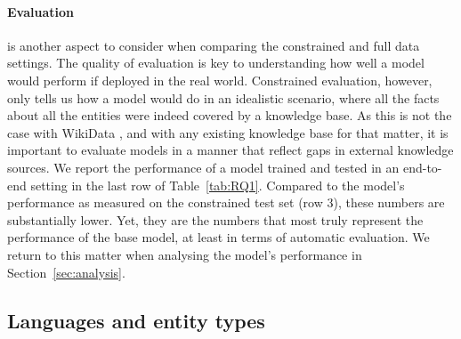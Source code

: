 \documentclass[11pt]{article}
\newcommand{\jttodo}[1]{\todo[color=blue!20]{#1}}
\begin{document}
\paragraph{Evaluation} is another aspect to consider when comparing the constrained and full data settings. The quality of evaluation is key to understanding how well a model would perform if deployed in the real world. Constrained evaluation, however, only tells us how a model would do in an idealistic scenario, where all the facts about all the entities were indeed covered by a knowledge base. As this is not the case with WikiData \cite{balaraman2018recoin}, and with any existing knowledge base for that matter, it is important to evaluate models in a manner that reflect gaps in external knowledge sources. We report the performance of a model trained and tested in an end-to-end setting in the last row of Table~\ref{tab:RQ1}. Compared to the model's performance as measured on the constrained test set (row 3), these numbers are substantially lower. Yet, they are the numbers that most truly represent the performance of the base model, at least in terms of automatic evaluation. We return to this matter when analysing the model's performance in Section~\ref{sec:analysis}.


\subsection{Languages and entity types}
\end{document}

